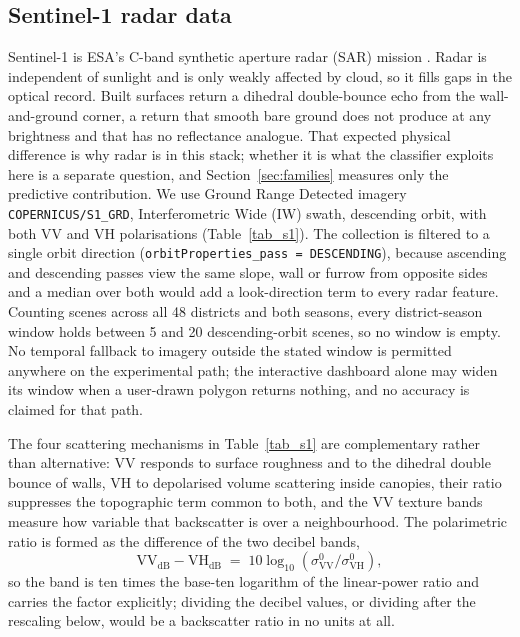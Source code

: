 \documentclass[conference]{IEEEtran}
\begin{document}
\subsection{Sentinel-1 radar data}
\label{sec:s1}
Sentinel-1 is ESA's C-band synthetic aperture radar (SAR) mission \cite{r6}. Radar is independent of sunlight and is only weakly affected by cloud, so it fills gaps in the optical record. Built surfaces return a dihedral double-bounce echo from the wall-and-ground corner, a return that smooth bare ground does not produce at any brightness and that has no reflectance analogue. That expected physical difference is why radar is in this stack; whether it is what the classifier exploits here is a separate question, and Section~\ref{sec:families} measures only the predictive contribution. We use Ground Range Detected imagery \texttt{COPERNICUS/S1\_GRD}, Interferometric Wide (IW) swath, descending orbit, with both VV and VH polarisations (Table~\ref{tab_s1}). The collection is filtered to a single orbit direction (\texttt{orbitProperties\_pass = DESCENDING}), because ascending and descending passes view the same slope, wall or furrow from opposite sides and a median over both would add a look-direction term to every radar feature. Counting scenes across all 48 districts and both seasons, every district-season window holds between 5 and 20 descending-orbit scenes, so no window is empty. No temporal fallback to imagery outside the stated window is permitted anywhere on the experimental path; the interactive dashboard alone may widen its window when a user-drawn polygon returns nothing, and no accuracy is claimed for that path.

The four scattering mechanisms in Table~\ref{tab_s1} are complementary rather than alternative: VV responds to surface roughness and to the dihedral double bounce of walls, VH to depolarised volume scattering inside canopies, their ratio suppresses the topographic term common to both, and the VV texture bands measure how variable that backscatter is over a neighbourhood. The polarimetric ratio is formed as the difference of the two decibel bands,
\begin{equation}
\mathrm{VV}_{\mathrm{dB}}-\mathrm{VH}_{\mathrm{dB}}
 \;=\; 10\log_{10}\!\left(\sigma^0_{\mathrm{VV}}\big/\sigma^0_{\mathrm{VH}}\right),
\label{eq:vvvh}
\end{equation}
so the band is ten times the base-ten logarithm of the linear-power ratio and carries the factor explicitly; dividing the decibel values, or dividing after the rescaling below, would be a backscatter ratio in no units at all.
\end{document}
